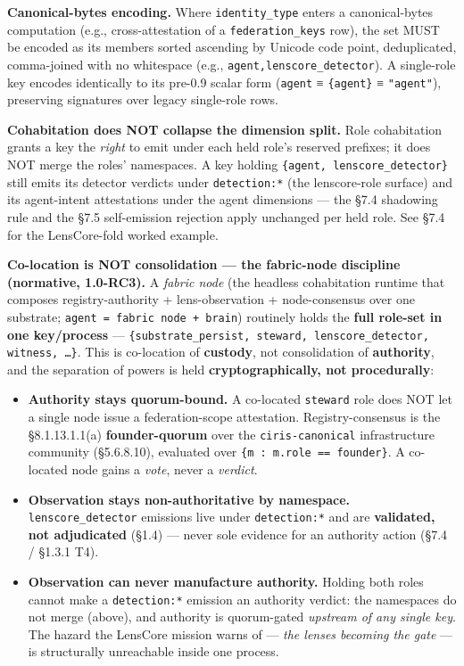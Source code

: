 \documentclass[10pt]{article}
\begin{document}
\textbf{Canonical-bytes encoding.} Where \texttt{identity\_type} enters a canonical-bytes computation (e.g., cross-attestation of a \texttt{federation\_keys} row), the set MUST be encoded as its members sorted ascending by Unicode code point, deduplicated, comma-joined with no whitespace (e.g., \texttt{agent,lenscore\_detector}). A single-role key encodes identically to its pre-0.9 scalar form (\texttt{agent} ≡ \texttt{\{agent\}} ≡ \texttt{"agent"}), preserving signatures over legacy single-role rows.


\textbf{Cohabitation does NOT collapse the dimension split.} Role cohabitation grants a key the \textit{right} to emit under each held role's reserved prefixes; it does NOT merge the roles' namespaces. A key holding \texttt{\{agent, lenscore\_detector\}} still emits its detector verdicts under \texttt{detection:*} (the lenscore-role surface) and its agent-intent attestations under the agent dimensions — the §7.4 shadowing rule and the §7.5 self-emission rejection apply unchanged per held role. See §7.4 for the LensCore-fold worked example.


\textbf{Co-location is NOT consolidation — the fabric-node discipline (normative, 1.0-RC3).} A \textit{fabric node} (the headless cohabitation runtime that composes registry-authority + lens-observation + node-consensus over one substrate; \texttt{agent = fabric node + brain}) routinely holds the \textbf{full role-set in one key/process} — \texttt{\{substrate\_persist, steward, lenscore\_detector, witness, …\}}. This is co-location of \textbf{custody}, not consolidation of \textbf{authority}, and the separation of powers is held \textbf{cryptographically, not procedurally}:


\begin{itemize}\setlength\itemsep{0pt}
\item \textbf{Authority stays quorum-bound.} A co-located \texttt{steward} role does NOT let a single node issue a federation-scope attestation. Registry-consensus is the §8.1.13.1.1(a) \textbf{founder-quorum} over the \texttt{ciris-canonical} infrastructure community (§5.6.8.10), evaluated over \texttt{\{m : m.role == founder\}}. A co-located node gains a \textit{vote}, never a \textit{verdict}.
\item \textbf{Observation stays non-authoritative by namespace.} \texttt{lenscore\_detector} emissions live under \texttt{detection:*} and are \textbf{validated, not adjudicated} (§1.4) — never sole evidence for an authority action (§7.4 / §1.3.1 T4).
\item \textbf{Observation can never manufacture authority.} Holding both roles cannot make a \texttt{detection:*} emission an authority verdict: the namespaces do not merge (above), and authority is quorum-gated \textit{upstream of any single key}. The hazard the LensCore mission warns of — \textit{the lenses becoming the gate} — is structurally unreachable inside one process.
\end{itemize}
\end{document}
